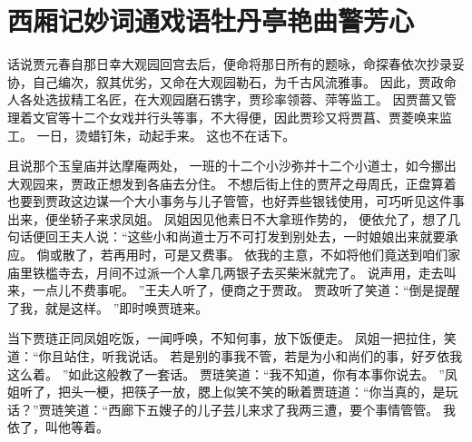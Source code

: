\chapter{西厢记妙词通戏语\quad 牡丹亭艳曲警芳心}
\par
话说贾元春自那日幸大观园回宫去后，便命将那日所有的题咏，命探春依次抄录妥协，自己编次，叙其优劣，又命在大观园勒石，为千古风流雅事。
因此，贾政命人各处选拔精工名匠，在大观园磨石镌字，贾珍率领蓉、萍等监工。
因贾蔷又管理着文官等十二个女戏并行头等事，不大得便，因此贾珍又将贾菖、贾菱唤来监工。
一日，烫蜡钉朱，动起手来。
这也不在话下。
\par
且说那个玉皇庙并达摩庵两处，
一班的十二个小沙弥并十二个小道士，如今挪出大观园来，贾政正想发到各庙去分住。
不想后街上住的贾芹之母周氏，正盘算着也要到贾政这边谋一个大小事务与儿子管管，也好弄些银钱使用，可巧听见这件事出来，便坐轿子来求凤姐。
凤姐因见他素日不大拿班作势的，
便依允了，想了几句话便回王夫人说：“这些小和尚道士万不可打发到别处去，一时娘娘出来就要承应。
倘或散了，若再用时，可是又费事。
依我的主意，不如将他们竟送到咱们家庙里铁槛寺去，月间不过派一个人拿几两银子去买柴米就完了。
说声用，走去叫来，一点儿不费事呢。
”王夫人听了，便商之于贾政。
贾政听了笑道：“倒是提醒了我，就是这样。
”即时唤贾琏来。
\par
当下贾琏正同凤姐吃饭，一闻呼唤，不知何事，放下饭便走。
凤姐一把拉住，笑道：“你且站住，听我说话。
若是别的事我不管，若是为小和尚们的事，好歹依我这么着。
”如此这般教了一套话。
贾琏笑道：“我不知道，你有本事你说去。
”凤姐听了，把头一梗，把筷子一放，腮上似笑不笑的瞅着贾琏道：“你当真的，是玩话？”贾琏笑道：“西廊下五嫂子的儿子芸儿来求了我两三遭，要个事情管管。
我依了，叫他等着。
